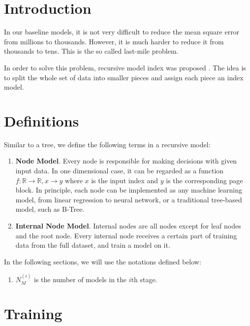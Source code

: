 \section{Introduction}


In our baseline models, it is not very difficult to reduce the mean square error from millions to thousands. However, it is much harder to reduce it from thousands to tens. This is the so called last-mile problem.

In order to solve this problem, recursive model index was proposed \cite{kraska2018case}. The idea is to split the whole set of data into smaller pieces and assign each piece an index model.

\section{Definitions}


Similar to a tree, we define the following terms in a recursive model:

\begin{enumerate}
	\item \textbf{Node Model}. Every node is responsible for making decisions with given input data. In one dimensional case, it can be regarded as a function $f:\mathbb{R}\to\mathbb{R}, x\to y$ where $x$ is the input index and $y$ is the corresponding page block. In principle, each node can be implemented as any machine learning model, from linear regression to neural network, or a traditional tree-based model, such as B-Tree.
	\item \textbf{Internal Node Model}. Internal nodes are all nodes except for leaf nodes and the root node. Every internal node receives a certain part of training data from the full dataset, and train a model on it. 
\end{enumerate}

In the following sections, we will use the notations defined below:
\begin{enumerate}
	\item $N_M^{(i)}$ is the number of models in the $i$th stage.
\end{enumerate}

\section{Training}

